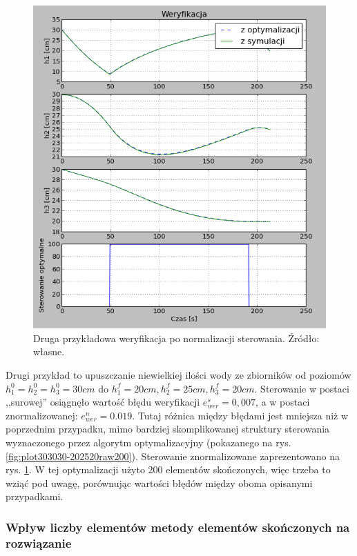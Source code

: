 \begin{figure}[htp]
    \centering
    \includegraphics{Grafika/plot_30_30_30-20_25_20_normalised_200}
    \caption{Druga przykładowa weryfikacja po normalizacji sterowania. Źródło: własne.}
    \label{fig:plot303030-202520normalised200}
\end{figure}

Drugi przykład to upuszczanie niewielkiej ilości wody ze zbiorników od poziomów $h_{1}^{0} = h_{2}^{0} = h_{3}^{0} = 30 cm$ do $h_{1}^{f} = 20 cm, h_{2}^{f} = 25 cm, h_{3}^{f} = 20 cm$. Sterowanie w postaci ,,surowej'' osiągnęło wartość błędu weryfikacji $e_{wer}^{s} = 0,007$, a w postaci znormalizowanej: $e_{wer}^{n} = 0.019$. Tutaj różnica między błędami jest mniejsza niż w poprzednim przypadku, mimo bardziej skomplikowanej struktury sterowania wyznaczonego przez algorytm optymalizacyjny (pokazanego na rys. \ref{fig:plot303030-202520raw200}). Sterowanie znormalizowane zaprezentowano na rys. \ref{fig:plot303030-202520normalised200}. W tej optymalizacji użyto 200 elementów skończonych, więc trzeba to wziąć pod uwagę, porównując wartości błędów między oboma opisanymi przypadkami.


\subsubsection{Wpływ liczby elementów metody elementów skończonych na rozwiązanie}

